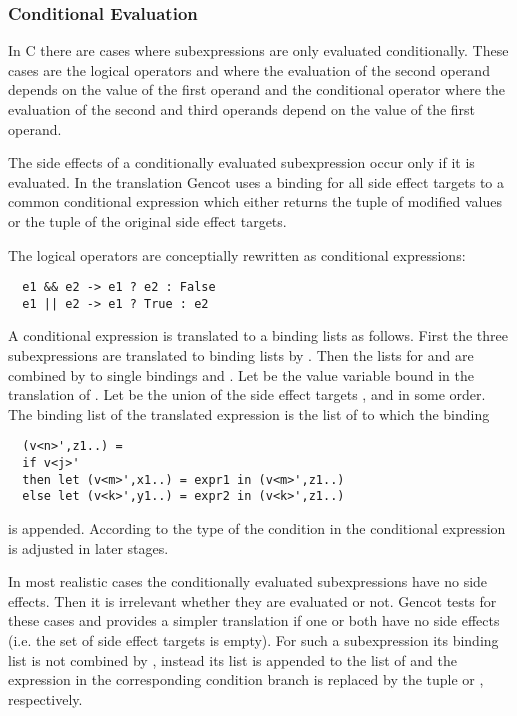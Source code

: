 \subsubsection{Conditional Evaluation}

In C there are cases where subexpressions are only evaluated conditionally. These cases are the logical operators \code{\&\&} and \code{||}
where the evaluation of the second operand depends on the value of the first operand and the conditional operator where the evaluation
of the second and third operands depend on the value of the first operand. 

The side effects of a conditionally evaluated subexpression occur only if it is evaluated. In the translation Gencot uses a binding for 
all side effect targets to a common conditional expression which either returns the tuple of modified values or the tuple of the original 
side effect targets. 

The logical operators are conceptially rewritten as conditional expressions:
\begin{verbatim}
  e1 && e2 -> e1 ? e2 : False
  e1 || e2 -> e1 ? True : e2
\end{verbatim}

A conditional expression  is translated to a binding lists as follows. First the three subexpressions are translated
to binding lists by . Then the lists for  and  are combined by  to single bindings
 and . Let  be the value variable bound in the translation
of . Let  be the union of the side effect targets , and  in some order. The binding list
of the translated expression is the list of  to which the binding
\begin{verbatim}
  (v<n>',z1..) = 
  if v<j>'
  then let (v<m>',x1..) = expr1 in (v<m>',z1..)
  else let (v<k>',y1..) = expr2 in (v<k>',z1..)
\end{verbatim}
is appended. According to the type of  the condition in the conditional expression is adjusted in later stages.

In most realistic cases the conditionally evaluated subexpressions have no side effects. Then it is irrelevant whether they are 
evaluated or not. Gencot tests for these cases and provides a simpler translation if one or both have no side effects (i.e. the set 
of side effect targets is empty). For such a subexpression
its binding list is not combined by , instead its list is appended to the list of  and the 
expression in the corresponding condition branch is replaced by the tuple  or , respectively.

